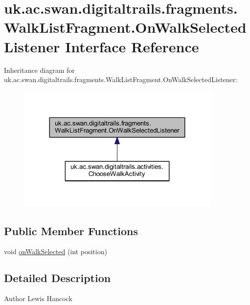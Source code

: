 \hypertarget{interfaceuk_1_1ac_1_1swan_1_1digitaltrails_1_1fragments_1_1_walk_list_fragment_1_1_on_walk_selected_listener}{\section{uk.\+ac.\+swan.\+digitaltrails.\+fragments.\+Walk\+List\+Fragment.\+On\+Walk\+Selected\+Listener Interface Reference}
\label{interfaceuk_1_1ac_1_1swan_1_1digitaltrails_1_1fragments_1_1_walk_list_fragment_1_1_on_walk_selected_listener}
}


Inheritance diagram for uk.\+ac.\+swan.\+digitaltrails.\+fragments.\+Walk\+List\+Fragment.\+On\+Walk\+Selected\+Listener\+:\nopagebreak
\begin{figure}[H]
\begin{center}
\leavevmode
\includegraphics[width=287pt]{interfaceuk_1_1ac_1_1swan_1_1digitaltrails_1_1fragments_1_1_walk_list_fragment_1_1_on_walk_selected_listener__inherit__graph}
\end{center}
\end{figure}
\subsection*{Public Member Functions}
\begin{DoxyCompactItemize}
\item 
void \hyperlink{interfaceuk_1_1ac_1_1swan_1_1digitaltrails_1_1fragments_1_1_walk_list_fragment_1_1_on_walk_selected_listener_af19cd80980e138911b94ea2dec0fd889}{on\+Walk\+Selected} (int position)
\end{DoxyCompactItemize}


\subsection{Detailed Description}
\begin{DoxyAuthor}{Author}
Lewis Hancock 
\end{DoxyAuthor}


